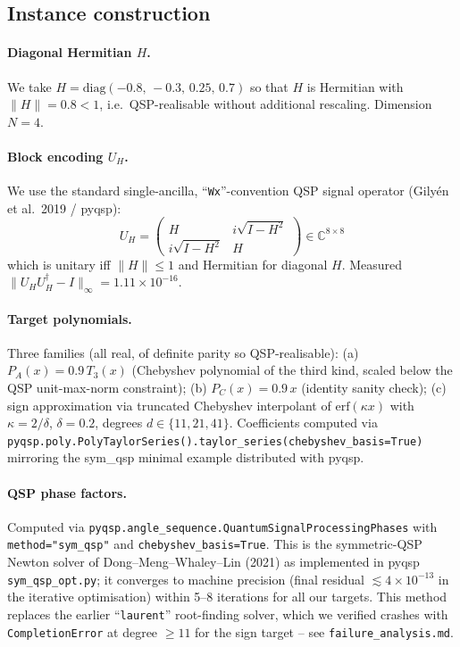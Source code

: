 \documentclass[11pt]{article}
\begin{document}
\subsection{Instance construction}

\paragraph{Diagonal Hermitian $H$.}
We take
$H = \mathrm{diag}(-0.8,\,-0.3,\,0.25,\,0.7)$
so that $H$ is Hermitian with $\lVert H\rVert = 0.8 < 1$, i.e.\
QSP-realisable without additional rescaling.  Dimension $N=4$.

\paragraph{Block encoding $U_H$.}
We use the standard single-ancilla, ``\texttt{Wx}''-convention QSP
signal operator (Gily\'en et al.\ 2019 / pyqsp):
\begin{equation}
U_H = \begin{pmatrix} H & i\sqrt{I-H^2} \\ i\sqrt{I-H^2} & H \end{pmatrix}
    \in \mathbb{C}^{8\times 8}
\end{equation}
which is unitary iff $\lVert H \rVert \le 1$ and Hermitian for diagonal
$H$.  Measured $\lVert U_H U_H^\dagger - I \rVert_\infty = 1.11 \times 10^{-16}$.

\paragraph{Target polynomials.}
Three families (all real, of definite parity so QSP-realisable):
(a) $P_A(x)=0.9\, T_3(x)$ (Chebyshev polynomial of the third kind,
scaled below the QSP unit-max-norm constraint);
(b) $P_C(x) = 0.9\, x$ (identity sanity check);
(c) sign approximation via truncated Chebyshev interpolant of
$\mathrm{erf}(\kappa x)$ with $\kappa = 2/\delta$, $\delta=0.2$, degrees
$d \in \{11,21,41\}$.  Coefficients computed via
\texttt{pyqsp.poly.PolyTaylorSeries().taylor\_series(chebyshev\_basis=True)}
mirroring the sym\_qsp minimal example distributed with pyqsp.

\paragraph{QSP phase factors.}
Computed via \texttt{pyqsp.angle\_sequence.QuantumSignalProcessingPhases}
with \texttt{method="sym\_qsp"} and \texttt{chebyshev\_basis=True}.
This is the symmetric-QSP Newton solver of Dong--Meng--Whaley--Lin
(2021) as implemented in pyqsp \texttt{sym\_qsp\_opt.py}; it converges
to machine precision (final residual $\lesssim 4\times 10^{-13}$ in the
iterative optimisation) within 5--8 iterations for all our targets.
This method replaces the earlier ``\texttt{laurent}'' root-finding
solver, which we verified crashes with \texttt{CompletionError} at
degree $\ge 11$ for the sign target -- see \texttt{failure\_analysis.md}.
\end{document}
